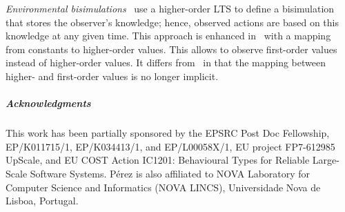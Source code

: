 \documentclass[a4paper,UKenglish]{lipics}
\theoremstyle{definition}
\begin{document}
\emph{Environmental bisimulations}~\cite{DBLP:conf/lics/SangiorgiKS07} 
use a higher-order LTS 
to define a bisimulation that stores the observer's knowledge; hence, observed actions are based on this knowledge
at any given time. This approach is enhanced in~\cite{DBLP:journals/cl/KoutavasH12}
with a mapping from constants to higher-order values. This 
allows to observe first-order values instead
of higher-order values. It differs from~\cite{San96H,JeffreyR05} in that 
the mapping between higher- and first-order values is no longer implicit.

\subparagraph{Acknowledgments} This work has been partially sponsored by the
EPSRC Post Doc Fellowship, EP/K011715/1, EP/K034413/1,
 and EP/L00058X/1, 
EU project FP7-612985 UpScale,
and EU
COST Action IC1201: Behavioural Types for Reliable Large-Scale Software Systems. %
P\'{e}rez is  also affiliated to NOVA  Laboratory for Computer Science and Informatics (NOVA LINCS),  Universidade Nova de Lisboa, Portugal.



%

{}
\end{document}
